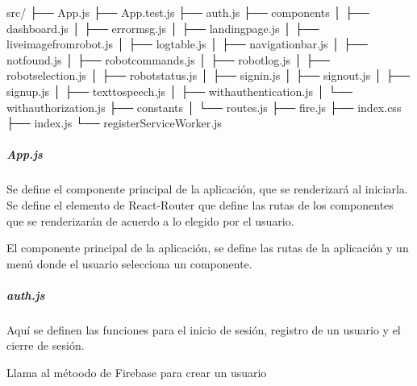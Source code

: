 %
\begin{sphinxVerbatim}[commandchars=\\\{\}]
src/
├── App.js
├── App.test.js
├── auth.js
├── components
│   ├── dashboard.js
│   ├── error\PYGZus{}msg.js
│   ├── landing\PYGZus{}page.js
│   ├── live\PYGZus{}image\PYGZus{}from\PYGZus{}robot.js
│   ├── log\PYGZus{}table.js
│   ├── navigation\PYGZus{}bar.js
│   ├── not\PYGZus{}found.js
│   ├── robot\PYGZus{}commands.js
│   ├── robot\PYGZus{}log.js
│   ├── robot\PYGZus{}selection.js
│   ├── robot\PYGZus{}status.js
│   ├── signin.js
│   ├── signout.js
│   ├── signup.js
│   ├── text\PYGZus{}to\PYGZus{}speech.js
│   ├── with\PYGZus{}authentication.js
│   └── with\PYGZus{}authorization.js
├── constants
│   └── routes.js
├── fire.js
├── index.css
├── index.js
└── registerServiceWorker.js
\end{sphinxVerbatim}


\subparagraph{App.js}
\label{\detokenize{code_docs:app-js}}
Se define el componente principal de la aplicación, que se renderizará
al iniciarla. Se define el elemento  de React-Router
que define las rutas de los componentes que se renderizarán de acuerdo a lo
elegido por el usuario.

\begin{fulllineitems}
\label{\detokenize{code_docs:App}}
El componente principal de la aplicación, se define las rutas de la aplicación
y un menú donde el usuario selecciona un componente.

\end{fulllineitems}



\subparagraph{auth.js}
\label{\detokenize{code_docs:auth-js}}
Aquí se definen las funciones para el inicio de sesión, registro de un usuario
y el cierre de sesión.

\begin{fulllineitems}
\label{\detokenize{code_docs:doCreateUserWithEmailAndPassword}}
Llama al métoodo  de Firebase para crear un usuario

\end{fulllineitems}


